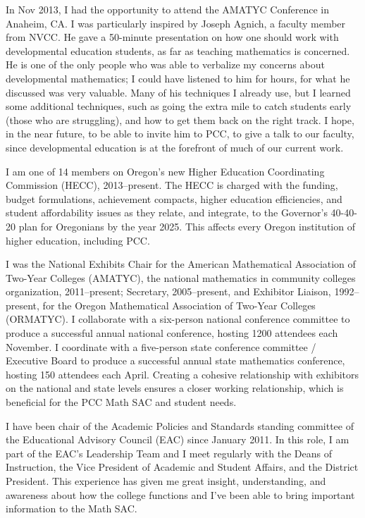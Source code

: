 \begin{description}[style=nextline]
	In Nov 2013, I had the opportunity to attend the AMATYC Conference in Anaheim,
	CA.  I was particularly inspired by Joseph Agnich, a faculty member from NVCC.
	He gave a 50-minute presentation on how one should work with developmental
	education students, as far as teaching mathematics is concerned.  He is one of
	the only people who was able to verbalize my concerns about developmental
	mathematics; I could have listened to him for hours, for what he discussed was
	very valuable.  Many of his techniques I already use, but I learned some
	additional techniques, such as going the extra mile to catch students early
	(those who are struggling), and how to get them back on the right track.  I
	hope, in the near future, to be able to invite him to PCC, to give a talk to
	our faculty, since developmental education is at the forefront of much of our
	current work.

	\item[Frank Goulard (Part-time Instructor, Sylvania Campus)]
	I am one of 14 members on Oregon's new Higher Education Coordinating
	Commission (HECC), 2013--present.  The HECC is charged with the funding, budget
	formulations, achievement compacts, higher education efficiencies, and student
	affordability issues as they relate, and integrate, to the Governor's
	40-40-20 plan for Oregonians by the year 2025. This affects every Oregon
	institution of higher education, including PCC.

	I was the National Exhibits Chair for the American Mathematical Association of
	Two-Year Colleges (AMATYC), the national mathematics in community colleges
	organization, 2011--present; Secretary, 2005--present, and Exhibitor Liaison,
	1992--present, for the Oregon Mathematical Association of Two-Year Colleges
	(ORMATYC). I collaborate with a six-person national conference committee to
	produce a successful annual national conference, hosting 1200 attendees each
	November. I coordinate with a five-person state conference committee /
	Executive Board to produce a successful annual state mathematics conference,
	hosting 150 attendees each April. Creating a cohesive relationship with
	exhibitors on the national and state levels ensures a closer working
	relationship, which is beneficial for the PCC Math SAC and student needs.

	\item[Peter Haberman (Full-time Instructor, Sylvania Campus)]
	I have been chair of the Academic Policies and Standards standing committee of
	the Educational Advisory Council (EAC) since January 2011.  In this role, I am
	part of the EAC's Leadership Team and I meet regularly with the Deans of
	Instruction, the Vice President of Academic and Student Affairs, and the
	District President.  This experience has given me great insight, understanding,
	and awareness about how the college functions and I've been able to bring
	important information to the Math SAC.


\end{description}
